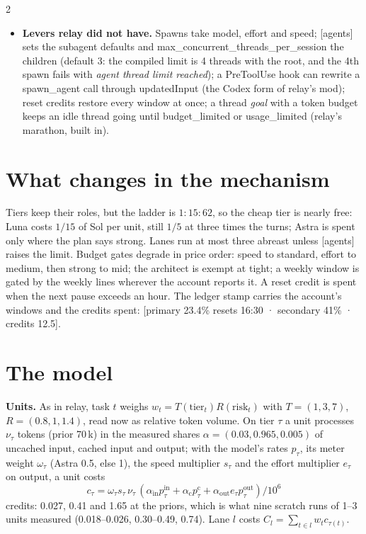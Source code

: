 \documentclass[9pt,a4paper]{extarticle}
\newcommand{\para}[1]{\textsf{\textbf{#1}}\enspace}
\begin{document}
\begin{multicols}{2}
\begin{itemize}
\item \para{Levers relay did not have.} Spawns take \textsf{model}, effort and speed; \textsf{[agents]} sets the subagent defaults and \textsf{max\_concurrent\_threads\_per\_session} the children (default 3: the compiled limit is 4 threads with the root, and the 4th spawn fails with \emph{agent thread limit reached}); a \textsf{PreToolUse} hook can rewrite a \textsf{spawn\_agent} call through \textsf{updatedInput} (the Codex form of relay's mod); reset credits restore every window at once; a thread \emph{goal} with a token budget keeps an idle thread going until \textsf{budget\_limited} or \textsf{usage\_limited} (relay's marathon, built in).
\end{itemize}

\section{What changes in the mechanism}
Tiers keep their roles, but the ladder is $1:15:62$, so the cheap tier is nearly free: Luna costs $1/15$ of Sol per unit, still $1/5$ at three times the turns; Astra is spent only where the plan says strong. Lanes run at most three abreast unless \textsf{[agents]} raises the limit. Budget gates degrade in price order: speed to standard, effort to medium, then strong to mid; the architect is exempt at tight; a weekly window is gated by the weekly lines wherever the account reports it. A reset credit is spent when the next pause exceeds an hour. The ledger stamp carries the account's windows and the credits spent: \textsf{[primary 23.4\% resets 16:30 · secondary 41\% · credits 12.5]}.

\section{The model}
\para{Units.} As in relay, task $t$ weighs $w_t=T(\text{tier}_t)R(\text{risk}_t)$ with $T=(1,3,7)$, $R=(0.8,1,1.4)$, read now as relative token volume. On tier $\tau$ a unit processes $\nu_\tau$ tokens (prior 70\,k) in the measured shares $\alpha=(0.03,0.965,0.005)$ of uncached input, cached input and output; with the model's rates $p_\tau$, its meter weight $\omega_\tau$ (Astra 0.5, else 1), the speed multiplier $s_\tau$ and the effort multiplier $e_\tau$ on output, a unit costs
\[
c_\tau=\omega_\tau s_\tau\,\nu_\tau\,(\alpha_{\mathrm{in}}p^{\mathrm{in}}_\tau+\alpha_{\mathrm{c}}p^{\mathrm{c}}_\tau+\alpha_{\mathrm{out}}e_\tau p^{\mathrm{out}}_\tau)/10^6
\]
credits: 0.027, 0.41 and 1.65 at the priors, which is what nine scratch runs of 1--3 units measured (0.018--0.026, 0.30--0.49, 0.74). Lane $l$ costs $C_l=\sum_{t\in l}w_t c_{\tau(t)}$.


\end{multicols}
\end{document}
